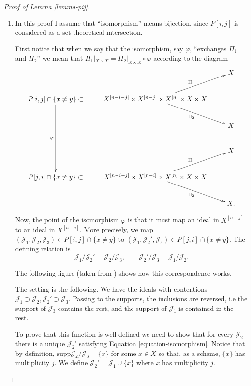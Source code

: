 \begin{proof}[Proof of Lemma \ref{lemma-pij}]
\begin{enumerate}
\item In this proof I assume that
``isomorphism'' means bijection, since
$P[i,j]$ is considered as a set-theoretical
intersection.

First notice that when we say that the
isomorphism, say $\varphi$,
``exchanges $\Pi_1$ and $\Pi_2$''
we mean that $\Pi_1|_{X \times X}=\Pi_2|_{X
\times X}\circ\varphi$
according to the diagram
$$
\xymatrix{
& & X\\
P[i,j] \cap \{x\neq y\}\subset
\ar[ddd]_\varphi&
\save{
X^{[n-i-j]}\times X^{[n-j]} \times X^{[n]}
\times X \times X
}
\ar[ur]^{\Pi_1}\ar[dr]_{\Pi_2}
\restore
\\
& & X\\
& & X\\
P[j,i]\cap\{x\neq y\}\subset&
X^{[n-i-j]}\times X^{[n-i]} \times X^{[n]}
\times X \times X
\ar[ur]^{\Pi_1}\ar[dr]_{\Pi_2}\\
& & X.
}
$$

Now, the point of the isomorphism $\varphi$
is that it must
map an ideal in $X^{[n-j]}$ to an ideal in
$X^{[n-i]}$.
More precisely, we map
$(\mathcal{J}_1,\mathcal{J}_2,\mathcal{J}_3)\in P[i,j] \cap \{x \neq  y\}$
to
$(\mathcal{J}_1,\mathcal{J}_2',\mathcal{J}_3) \in P[j,i]\cap \{x \neq y\}$.
The defining relation is
\begin{equation}
\label{equation-isomorphism}
\mathcal{J}_1/\mathcal{J}_2'=\mathcal{J}_2/\mathcal{J}_3,\qquad
\mathcal{J}_2'/\mathcal{J}_3=\mathcal{J}_1/\mathcal{J}_2.
\end{equation}

\noindent
The following figure
(taken from \cite{Nakajima-lectures})
shows how this correspondence works.

The setting is the following. We have the
ideals with contentions
$\mathcal{J}_1\supset
\mathcal{J}_2,\mathcal{J}_2'\supset
\mathcal{J}_3$.
Passing to the supports, the inclusions are
reversed, i.e
the support of $\mathcal{J}_3$ contains the
rest,
and the support of $\mathcal{J}_1$ is
contained in the rest.

To prove that this function is well-defined
we need to show that for every
$\mathcal{J}_2$ there is a unique
$\mathcal{J}_2'$ satisfying Equation
\ref{equation-isomorphism}.
Notice that by definition,
$\text{supp}\mathcal{J}_2/\mathcal{J}_3=\{x\}$
for some $x \in X$ so that, as a scheme,
$\{x\}$ has multiplicity $j$.
We define
$\mathcal{J}_2'=\mathcal{J}_1\cup \{x\}$
where $x$ has multiplicity $j$.


\end{enumerate}
\end{proof}
